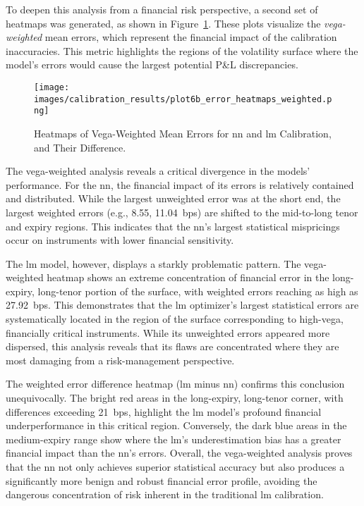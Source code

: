 To deepen this analysis from a financial risk perspective, a second set of heatmaps was generated, as shown in Figure~\ref{fig:error_heatmaps_weighted}. These plots visualize the \textit{vega-weighted} mean errors, which represent the financial impact of the calibration inaccuracies. This metric highlights the regions of the volatility surface where the model's errors would cause the largest potential P\&L discrepancies.

\begin{figure}[H]
	\centering
	\texttt{[image: images/calibration\_results/plot6b\_error\_heatmaps\_weighted.png]}
	\caption{Heatmaps of Vega-Weighted Mean Errors for \ac{nn} and \ac{lm} Calibration, and Their Difference.}
	\label{fig:error_heatmaps_weighted}
\end{figure}

The vega-weighted analysis reveals a critical divergence in the models' performance. For the \ac{nn}, the financial impact of its errors is relatively contained and distributed. While the largest unweighted error was at the short end, the largest weighted errors (e.g., 8.55, 11.04~\ac{bps}) are shifted to the mid-to-long tenor and expiry regions. This indicates that the \ac{nn}'s largest statistical mispricings occur on instruments with lower financial sensitivity.

The \ac{lm} model, however, displays a starkly problematic pattern. The vega-weighted heatmap shows an extreme concentration of financial error in the long-expiry, long-tenor portion of the surface, with weighted errors reaching as high as 27.92~\ac{bps}. This demonstrates that the \ac{lm} optimizer's largest statistical errors are systematically located in the region of the surface corresponding to high-vega, financially critical instruments. While its unweighted errors appeared more dispersed, this analysis reveals that its flaws are concentrated where they are most damaging from a risk-management perspective.

The weighted error difference heatmap (\ac{lm} minus \ac{nn}) confirms this conclusion unequivocally. The bright red areas in the long-expiry, long-tenor corner, with differences exceeding 21~\ac{bps}, highlight the \ac{lm} model's profound financial underperformance in this critical region. Conversely, the dark blue areas in the medium-expiry range show where the \ac{lm}'s underestimation bias has a greater financial impact than the \ac{nn}'s errors. Overall, the vega-weighted analysis proves that the \ac{nn} not only achieves superior statistical accuracy but also produces a significantly more benign and robust financial error profile, avoiding the dangerous concentration of risk inherent in the traditional \ac{lm} calibration.

